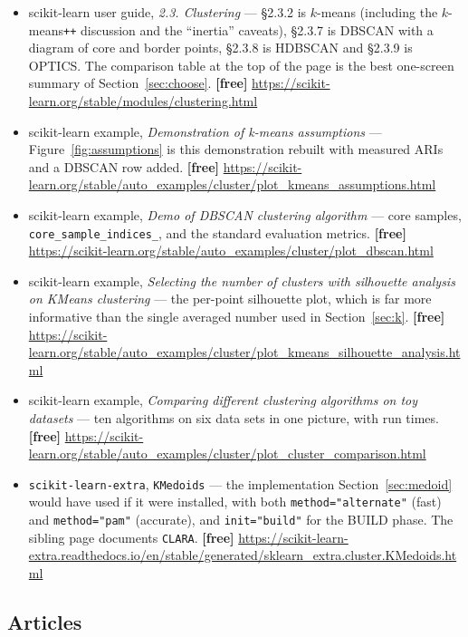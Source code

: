 \documentclass[11pt]{article}
\begin{document}
\begin{itemize}[leftmargin=*]
  \item scikit-learn user guide, \emph{2.3. Clustering} --- \S2.3.2 is
    $k$-means (including the $k$-means\texttt{++} discussion and the
    ``inertia'' caveats), \S2.3.7 is DBSCAN with a diagram of core and border
    points, \S2.3.8 is HDBSCAN and \S2.3.9 is OPTICS. The comparison table at
    the top of the page is the best one-screen summary of
    Section~\ref{sec:choose}. \textbf{[free]}
    \url{https://scikit-learn.org/stable/modules/clustering.html}
  \item scikit-learn example, \emph{Demonstration of k-means assumptions} ---
    Figure~\ref{fig:assumptions} is this demonstration rebuilt with measured
    ARIs and a DBSCAN row added. \textbf{[free]}
    \url{https://scikit-learn.org/stable/auto_examples/cluster/plot_kmeans_assumptions.html}
  \item scikit-learn example, \emph{Demo of DBSCAN clustering algorithm} ---
    core samples, \texttt{core\_sample\_indices\_}, and the standard
    evaluation metrics. \textbf{[free]}
    \url{https://scikit-learn.org/stable/auto_examples/cluster/plot_dbscan.html}
  \item scikit-learn example, \emph{Selecting the number of clusters with
    silhouette analysis on KMeans clustering} --- the per-point silhouette
    plot, which is far more informative than the single averaged number used
    in Section~\ref{sec:k}. \textbf{[free]}
    \url{https://scikit-learn.org/stable/auto_examples/cluster/plot_kmeans_silhouette_analysis.html}
  \item scikit-learn example, \emph{Comparing different clustering algorithms
    on toy datasets} --- ten algorithms on six data sets in one picture, with
    run times. \textbf{[free]}
    \url{https://scikit-learn.org/stable/auto_examples/cluster/plot_cluster_comparison.html}
  \item \texttt{scikit-learn-extra}, \texttt{KMedoids} --- the implementation
    Section~\ref{sec:medoid} would have used if it were installed, with both
    \texttt{method="alternate"} (fast) and \texttt{method="pam"} (accurate),
    and \texttt{init="build"} for the BUILD phase. The sibling page documents
    \texttt{CLARA}. \textbf{[free]}
    \url{https://scikit-learn-extra.readthedocs.io/en/stable/generated/sklearn_extra.cluster.KMedoids.html}
\end{itemize}

\subsection*{Articles}
\end{document}
